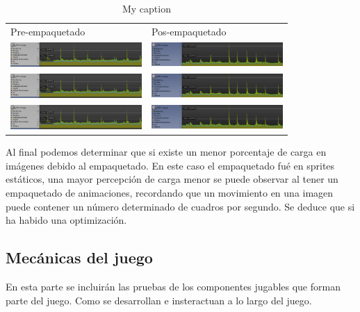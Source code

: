 \begin{table}[]
	\centering
	\caption{My caption}
	\label{my-label}
	\begin{tabular}{ll}
		Pre-empaquetado & Pos-empaquetado \\
	\includegraphics[width=5cm]{imagenes/spritespack/pre/01}	& \includegraphics[width=5cm]{imagenes/spritespack/pos/01}                 \\
	\includegraphics[width=5cm]{imagenes/spritespack/pre/01}	& \includegraphics[width=5cm]{imagenes/spritespack/pos/01}    \\
	\includegraphics[width=5cm]{imagenes/spritespack/pre/01}	& \includegraphics[width=5cm]{imagenes/spritespack/pos/01}       
	    
	\end{tabular}
\end{table}

Al final podemos determinar que si existe un menor porcentaje de carga en imágenes debido al empaquetado. En este caso el empaquetado fué en sprites estáticos, una mayor percepción de carga menor se puede observar al tener un empaquetado de animaciones, recordando que un movimiento en una imagen puede contener un número determinado de cuadros por segundo. Se deduce que si ha habido una optimización.

\subsection{Mecánicas del juego}
En esta parte se incluirán las pruebas de los componentes jugables que forman parte del juego. Como se desarrollan e insteractuan a lo largo del juego.
